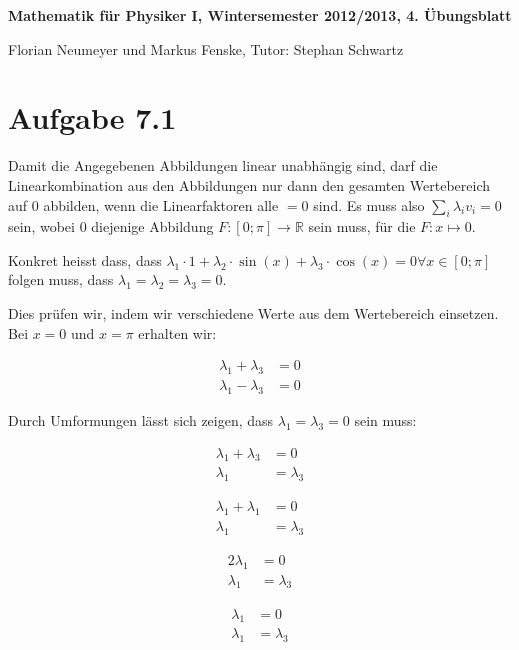 \documentclass[a4paper,german,12pt,smallheadings]{scrartcl}
\begin{document}
\begin{center}
\bfseries %
\sffamily %
\vspace{-40pt}
Mathematik für Physiker I, Wintersemester 2012/2013, 4. Übungsblatt

Florian Neumeyer und Markus Fenske, Tutor: Stephan Schwartz
\vspace{-10pt}
\end{center}

\section*{Aufgabe 7.1}

Damit die Angegebenen Abbildungen linear unabhängig sind, darf die
Linearkombination aus den Abbildungen nur dann den gesamten Wertebereich auf
${0}$ abbilden, wenn die Linearfaktoren alle $= 0$ sind. Es muss also $\sum_{i}
\lambda_{i} v_i = 0$ sein, wobei $0$ diejenige Abbildung $F:
[0;\pi] \to \mathbb{R}$ sein muss, für die $F: x \mapsto 0$.

Konkret heisst dass, dass $\lambda_1 \cdot 1 + \lambda_2 \cdot \sin(x) +
\lambda_3 \cdot \cos(x) = 0 \forall x \in [0;\pi]$ folgen muss, dass $\lambda_1 = \lambda_2 =
\lambda_3 = 0$.

Dies prüfen wir, indem wir verschiedene Werte aus dem Wertebereich einsetzen.
Bei $x = 0$ und $x = \pi$ erhalten wir:

\begin{align*}
\lambda_1 + \lambda_3 &= 0 \\
\lambda_1 - \lambda_3 &= 0
\end{align*}

Durch Umformungen lässt sich zeigen, dass $\lambda_1 = \lambda_3 = 0$ sein muss:

\begin{align*}
\lambda_1 + \lambda_3 &= 0 \\
\lambda_1 &= \lambda_3
\end{align*}

\begin{align*}
\lambda_1 + \lambda_1 &= 0 \\
\lambda_1 &= \lambda_3
\end{align*}

\begin{align*}
2\lambda_1 &= 0 \\
\lambda_1 &= \lambda_3
\end{align*}

\begin{align*}
\lambda_1 &= 0 \\
\lambda_1 &= \lambda_3
\end{align*}
\end{document}
